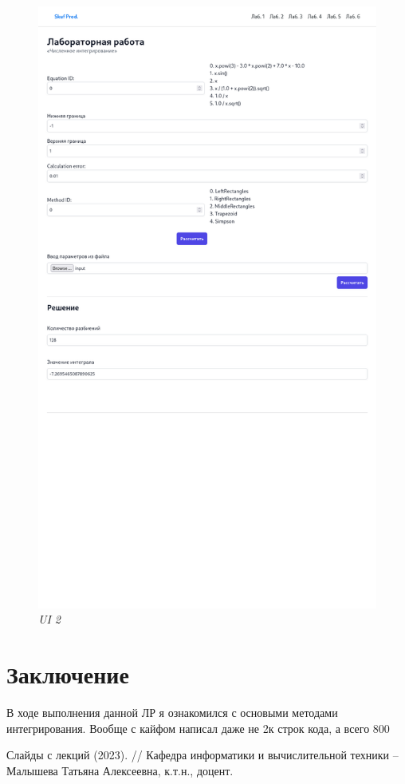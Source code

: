 \documentclass{article}
\begin{document}
            \begin{figure}[H] 
                  \begin{center}  
                         \includegraphics[scale=0.3]{ui2.png}
                        \caption{\small \sl {UI  2}}  
                  \end{center}  
            \end{figure}

\section{Заключение}
      В ходе выполнения данной ЛР я ознакомился с основыми методами интегрирования. Вообще с кайфом написал даже не 2к строк кода, а всего 800

\begin{thebibliography}{9}
    Слайды с лекций (2023). // Кафедра информатики и вычислительной техники -- Малышева Татьяна Алексеевна, к.т.н., доцент.
\end{thebibliography} 
\end{document}
